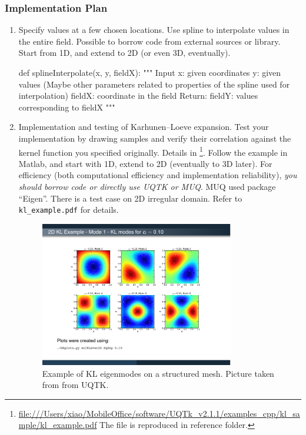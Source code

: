 \documentclass[paper = letter, fontsize = 11pt]{scrartcl} %
\begin{document}
\subsubsection{Implementation Plan}

\begin{enumerate}
\item Specify values at a few chosen locations. Use spline to interpolate values in the entire
  field. Possible to borrow code from external sources or library. Start from 1D, and extend to 2D
  (or even 3D, eventually).
  \begin{python}
 def splineInterpolate(x, y, fieldX):
 """
 Input
 x: given coordinates
 y: given values
 (Maybe other parameters related to properties of the spline used for interpolation)
 fieldX: coordinate in the field
 Return: 
 fieldY: values corresponding to fieldX
 """
  \end{python}



\item Implementation and testing of Karhunen--Loeve expansion. Test your implementation by drawing
  samples and verify their correlation against the kernel function you specified originally. Details
  in
  \footnote{\url{file:///Users/xiao/MobileOffice/software/UQTk_v2.1.1/examples_cpp/kl_sample/kl_example.pdf}
    The file is reproduced in reference folder.}.  Follow the example in Matlab, and start with 1D,
  extend to 2D (eventually to 3D later). For efficiency (both computational efficiency and
  implementation reliability), \emph{you should borrow code or directly use UQTK or MUQ}. MUQ used
  package ``Eigen''.  There is a test case on 2D irregular domain. Refer to \verb+kl_example.pdf+
  for details.

\begin{figure}[htbp]
  \centering
  \includegraphics[width=0.8\textwidth]{KL-example-structured.pdf}
  \caption{Example of KL eigenmodes on a structured mesh. Picture taken from from UQTK.}
  \label{fig:box}
\end{figure}


\end{enumerate}
\end{document}
